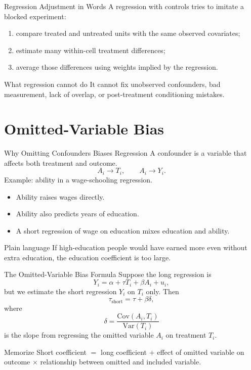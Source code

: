 \documentclass[11pt,aspectratio=169]{beamer}
\newcommand{\Var}{\mathrm{Var}}
\newcommand{\Cov}{\mathrm{Cov}}
\newcommand{\derivbutton}[1]{\vspace{0.4em}\hfill\hyperlink{app:#1}{\beamerbutton{Appendix details}}}
\begin{document}
\begin{frame}{Regression Adjustment in Words}
  A regression with controls tries to imitate a blocked experiment:
  \begin{enumerate}
    \item compare treated and untreated units with the same observed covariates;
    \item estimate many within-cell treatment differences;
    \item average those differences using weights implied by the regression.
  \end{enumerate}
  \vspace{0.3em}
  \begin{block}{What regression cannot do}
    It cannot fix unobserved confounders, bad measurement, lack of overlap, or post-treatment conditioning mistakes.
  \end{block}
\end{frame}

\section{Omitted-Variable Bias}

\begin{frame}{Why Omitting Confounders Biases Regression}
  A confounder is a variable that affects both treatment and outcome.
  \[
    A_i \rightarrow T_i,\qquad A_i \rightarrow Y_i.
  \]
  Example: ability in a wage-schooling regression.
  \begin{itemize}
    \item Ability raises wages directly.
    \item Ability also predicts years of education.
    \item A short regression of wage on education mixes education and ability.
  \end{itemize}
  \begin{block}{Plain language}
    If high-education people would have earned more even without extra education, the education coefficient is too large.
  \end{block}
\end{frame}

\begin{frame}{The Omitted-Variable Bias Formula}
  \hypertarget{main:ovb}{}
  Suppose the long regression is
  \[
    Y_i=\alpha+\tau T_i+\beta A_i+u_i,
  \]
  but we estimate the short regression \(Y_i\) on \(T_i\) only.
  Then
  \[
    \tau_{\text{short}}
    =
    \tau+\beta\delta,
  \]
  where
  \[
    \delta = \frac{\Cov(A_i,T_i)}{\Var(T_i)}
  \]
  is the slope from regressing the omitted variable \(A_i\) on treatment \(T_i\).
  \begin{block}{Memorize}
    Short coefficient \(=\) long coefficient \(+\) effect of omitted variable on outcome \(\times\) relationship between omitted and included variable.
  \end{block}
  \derivbutton{ovb}
\end{frame}
\end{document}
